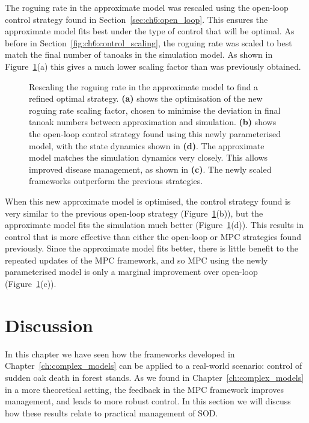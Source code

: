 The roguing rate in the approximate model was rescaled using the open-loop control strategy found in Section~\ref{sec:ch6:open_loop}. This ensures the approximate model fits best under the type of control that will be optimal. As before in Section~\ref{fig:ch6:control_scaling}, the roguing rate was scaled to best match the final number of tanoaks in the simulation model. As shown in Figure~\ref{fig:ch6:Global_optimal}(a) this gives a much lower scaling factor than was previously obtained.

\begin{figure}[t!]
    \begin{center}
        \caption[Refined optimal strategy under rescaled roguing rate]{Rescaling the roguing rate in the approximate model to find a refined optimal strategy. \textbf{(a)} shows the optimisation of the new roguing rate scaling factor, chosen to minimise the deviation in final tanoak numbers between approximation and simulation. \textbf{(b)} shows the open-loop control strategy found using this newly parameterised model, with the state dynamics shown in \textbf{(d)}. The approximate model matches the simulation dynamics very closely. This allows improved disease management, as shown in \textbf{(c)}. The newly scaled frameworks outperform the previous strategies.\label{fig:ch6:Global_optimal}}
    \end{center}
\end{figure}

When this new approximate model is optimised, the control strategy found is very similar to the previous open-loop strategy (Figure~\ref{fig:ch6:Global_optimal}(b)), but the approximate model fits the simulation much better (Figure~\ref{fig:ch6:Global_optimal}(d)). This results in control that is more effective than either the open-loop or MPC strategies found previously. Since the approximate model fits better, there is little benefit to the repeated updates of the MPC framework, and so MPC using the newly parameterised model is only a marginal improvement over open-loop (Figure~\ref{fig:ch6:Global_optimal}(c)).

\FloatBarrier
\section{Discussion\label{sec:ch6:discussion}}

In this chapter we have seen how the frameworks developed in Chapter~\ref{ch:complex_models} can be applied to a real-world scenario: control of sudden oak death in forest stands. As we found in Chapter~\ref{ch:complex_models} in a more theoretical setting, the feedback in the MPC framework improves management, and leads to more robust control. In this section we will discuss how these results relate to practical management of SOD.


